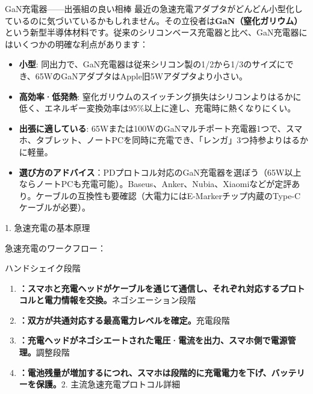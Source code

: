 \begin{tcbinfo}{GaN充電器——出張組の良い相棒}
最近の急速充電アダプタがどんどん小型化しているのに気づいているかもしれません。その立役者は\textbf{GaN（窒化ガリウム）}という新型半導体材料です。従来のシリコンベース充電器と比べ、GaN充電器にはいくつかの明確な利点があります：

\begin{itemize}
  \item \textbf{小型}: 同出力で、GaN充電器は従来シリコン製の1/2から1/3のサイズにでき、65WのGaNアダプタはApple旧5Wアダプタより小さい。
  \item \textbf{高効率·低発熱}: 窒化ガリウムのスイッチング損失はシリコンよりはるかに低く、エネルギー変換効率は95\%以上に達し、充電時に熱くなりにくい。
  \item \textbf{出張に適している}: 65Wまたは100WのGaNマルチポート充電器1つで、スマホ、タブレット、ノートPCを同時に充電でき、「レンガ」3つ持参よりはるかに軽量。
  \item \textbf{選び方のアドバイス}：PDプロトコル対応のGaN充電器を選ぼう（65W以上ならノートPCも充電可能）。Baseus、Anker、Nubia、Xiaomiなどが定評あり。ケーブルの互換性も要確認（大電力にはE-Markerチップ内蔵のType-Cケーブルが必要）。
\end{itemize}

\end{tcbinfo}


1. 急速充電の基本原理


急速充電のワークフロー：

ハンドシェイク段階

\begin{enumerate}
  \item \textbf{：スマホと充電ヘッドがケーブルを通じて通信し、それぞれ対応するプロトコルと電力情報を交換。}ネゴシエーション段階
  \item \textbf{：双方が共通対応する最高電力レベルを確定。}充電段階
  \item \textbf{：充電ヘッドがネゴシエートされた電圧·電流を出力、スマホ側で電源管理。}調整段階
  \item \textbf{：電池残量が増加するにつれ、スマホは段階的に充電電力を下げ、バッテリーを保護。}2. 主流急速充電プロトコル詳細
\end{enumerate}

